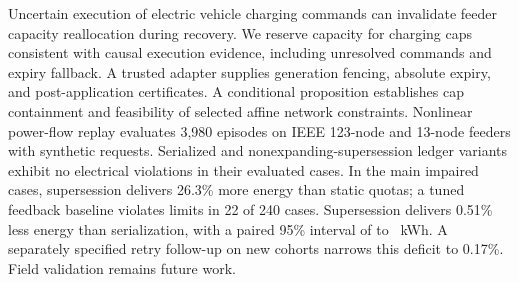 Uncertain execution of electric vehicle charging commands can invalidate feeder
capacity reallocation during recovery. We reserve capacity for charging caps
consistent with causal execution evidence, including unresolved commands and
expiry fallback. A trusted adapter supplies generation fencing, absolute expiry,
and post-application certificates. A conditional proposition establishes cap
containment and feasibility of selected affine network constraints. Nonlinear
power-flow replay evaluates 3,980 episodes on IEEE 123-node and 13-node feeders
with synthetic requests. Serialized and nonexpanding-supersession ledger variants
exhibit no electrical violations in their evaluated cases. In the main impaired
cases, supersession delivers 26.3\% more energy than static quotas; a tuned feedback
baseline violates limits in 22 of 240 cases. Supersession delivers 0.51\% less
energy than serialization, with a paired 95\% interval of  to
~kWh. A separately specified retry follow-up on new cohorts narrows
this deficit to 0.17\%. Field validation remains future work.
